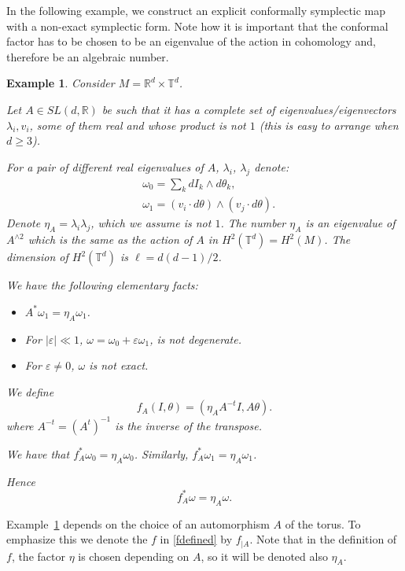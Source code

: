 \documentclass[11pt]{amsart}
\newtheorem{ex}[thm]{Example}
\theoremstyle{definition}
\theoremstyle{remark}
\numberwithin{equation}{section}
\newcommand{\R}{\mathbb R}
\newcommand{\T}{\mathbb T}
\newcommand{\eps}{\varepsilon}
\begin{document}
In the following example, we construct an explicit
conformally symplectic map with a non-exact symplectic form.
Note how it is important that  the conformal factor has to be chosen to be an
eigenvalue of the action in cohomology and, therefore be
an algebraic number.

  \begin{ex}
  \label{concrete}
  Consider $M = \R^d \times \T^d$.

  Let $A \in SL(d, \R) $ be such that it has a complete
  set of eigenvalues/eigenvectors  $\lambda_i, v_i$, some of them real
  and whose product is not $1$ (this is easy to arrange  when $d \ge 3$).

  For a pair of different real eigenvalues of $A$, $\lambda_i$, $\lambda_j$
  denote:
  \[
  \begin{split}
  & \omega_0 = \sum_k dI_k \wedge d\theta_k ,\\
  & \omega_1 = (v_i \cdot d\theta) \wedge (v_j \cdot d\theta) .
\end{split}
  \]
  Denote $\eta_A= \lambda_i \lambda_j$,
  which we assume is not $1$. The number $\eta_A$ is
  an eigenvalue of $A^{\wedge 2}$ which is the same as the action of
  $A$ in $H^2(\T^d) = H^2( M)$.  The dimension of $H^2(\T^d)$ is
  $\ell = d(d-1)/2$.



  We have the following
  elementary facts:
  \begin{itemize}
  \item
    $A^* \omega_1 = \eta_A \omega_1$.
 \item
For $|\eps| \ll 1$,
$\omega = \omega_0 + \eps \omega_1$, is not degenerate.
\item
  For $\eps \ne 0$, $\omega$ is not exact.
\end{itemize}



  We define
  \begin{equation}
\label{fdefined}
  f_A(I,\theta) = ( \eta_A A^{-t } I, A \theta).
  \end{equation}
where  $A^{-t} = (A^t)^{-1}$ is the inverse of the transpose.


  We have that $f_A ^*\omega_0 = \eta_A \omega_0$.
  Similarly, $f^*_A\omega_1 = \eta_A \omega_1$.

  Hence
  \[
  f^*_A \omega = \eta_A \omega .
  \]
\end{ex}

Example~\ref{concrete} depends on the choice
of an automorphism $A$ of the torus.  To emphasize
this we denote the $f$ in \eqref{fdefined}
by $f_{\mid A}$.
Note that in the definition of $f$,
the factor $\eta$ is chosen depending on $A$,
so it will be denoted also $\eta_A$.
\end{document}
